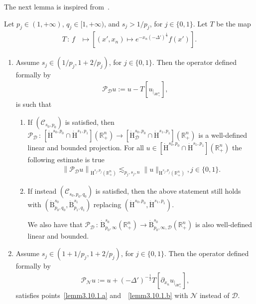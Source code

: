 \documentclass[AHL,Unicode,longabstracts,published]{cedram}
\newcommand{\bbR}{\mathbb{R}}
\newcommand{\rmH}{\mathrm{H}}%
\newcommand{\rmB}{\mathrm{B}}
\newcommand{\clC}{\mathcal{C}}
\newcommand{\clN}{\mathcal{N}}
\newcommand{\clD}{\mathcal{D}}
\newcommand{\clP}{\mathcal{P}}
\newcommand*{\romanenumi}{\renewcommand*{\theenumi}{\roman{enumi}}}
\begin{document}
The next lemma is inspired from~\cite[Lemma~2.4]{Guidetti1991Interp}.

\begin{lemm}\label{lem:ProjectDirNeuBC}
Let $p_j\in(1,+\infty)$, $q_j\in[1,+\infty)$, and $s_j>1/p_j$, for $j\in\{ 0,1\}$. Let $T$ be the map
\begin{align*}
T\,:\,f & \longmapsto \left[(x',x_n)\mapsto e^{-x_n(-\Delta')^\frac{1}{2}}f(x') \right] .
\end{align*}
\begin{enumerate}\romanenumi
\item\label{lemm3.10.1} Assume $s_j\in(1/p_j,1+2/p_j)$, for $j\in\{0,1\}$. Then the operator defined formally by
\begin{align*}
\clP _{\clD} u:= u - T\left[u_{|_{\partial\bbR^n_+}}\right],
\end{align*}
is such that
\begin{enumerate}
\item\label{lemm3.10.1.a} If $(\clC_{s_0,p_0})$ is satisfied, then $\clP _{\clD} \,:\,[\dot{\rmH}^{s_0,p_0}\cap\dot{\rmH}^{s_1,p_1}](\bbR^n_+) \longrightarrow [\dot{\rmH}^{s_0,p_0}_{\clD}\cap\dot{\rmH}^{s_1,p_1}](\bbR^n_+)$ is a well-defined linear and bounded projection. For all $u\in [\dot{\rmH}^{s_0,p_0}\cap\dot{\rmH}^{s_1,p_1}](\bbR^n_+)$ the following estimate is true
\begin{align*}
\left\| \clP _{\clD} u \right\|_{\dot{\rmH}^{s_j,p_j}\left(\bbR^n_+\right)} \lesssim_{p_j,s_j,n} \| u \|_{\dot{\rmH}^{s_j,p_j}\left(\bbR^n_+\right)}, j\in\{0,1\} .
\end{align*}
\item\label{lemm3.10.1.b} If instead $(\clC_{s_0,p_0,q_0})$ is satisfied, then the above statement still holds with $(\dot{\rmB}^{s_0}_{p_0,q_0},\dot{\rmB}^{s_1}_{p_1,q_1})$ replacing $(\dot{\rmH}^{s_0,p_0},\dot{\rmH}^{s_1,p_1})$.

We also have that $\clP _{\clD}\,:\,\dot{\rmB}^{s_0}_{p_0,\infty}(\bbR^n_+)\longrightarrow \dot{\rmB}^{s_0}_{p_0,\infty,\clD}(\bbR^n_+)$ is also well-defined linear and bounded.
\end{enumerate}
\item\label{lemm3.10.2} Assume $s_j\in(1+1/p_j,1+2/p_j)$, for $j\in\{0,1\}$. Then the operator defined formally by
\begin{align*}
\clP _{\clN} u:= u + (-\Delta')^{-\frac{1}{2}}T\left[\partial_{x_n}u_{|_{\partial\bbR^n_+}}\right],
\end{align*}
satisfies points~\eqref{lemm3.10.1.a} and~~\eqref{lemm3.10.1.b} with $\clN$ instead of $\clD$.
\end{enumerate}
\end{lemm}
\end{document}
